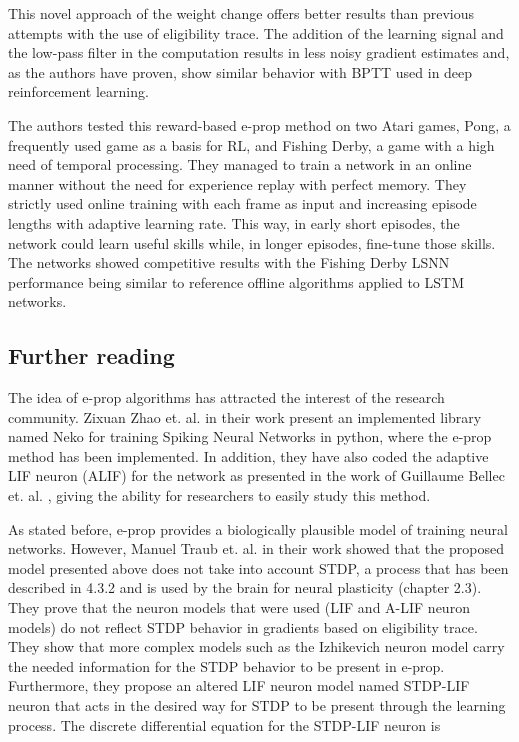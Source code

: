\documentclass[12pt]{report}
\begin{document}
This novel approach of the weight change offers better results than previous attempts with the use of eligibility trace. The addition of the learning signal and the low-pass filter in the computation results in less noisy gradient estimates and, as the authors have proven, show similar behavior with BPTT used in deep reinforcement learning. 

The authors tested this reward-based e-prop method on two Atari games, Pong, a frequently used game as a basis for RL, and Fishing Derby, a game with a high need of temporal processing. They managed to train a network in an online manner without the need for experience replay with perfect memory. They strictly used online training with each frame as input and increasing episode lengths with adaptive learning rate. This way, in early short episodes, the network could learn useful skills while, in longer episodes, fine-tune those skills. The networks showed competitive results with the Fishing Derby LSNN performance being similar to reference offline algorithms applied to LSTM networks.

\subsection{Further reading}

The idea of e-prop algorithms has attracted the interest of the research community. Zixuan Zhao et. al. in their work \cite{Brasoveanu2020} present an implemented library named Neko for training Spiking Neural Networks in python, where the e-prop method has been implemented. In addition, they have also coded the adaptive LIF neuron (ALIF) for the network as presented in the work of Guillaume  Bellec et. al. \cite{Bellec2020}, giving the ability for researchers to easily study this method. 

As stated before, e-prop provides a biologically plausible model of training neural networks. However, Manuel Traub et. al. in their work \cite{Traub2020} showed that the proposed model presented above does not take into account STDP, a process that has been described in 4.3.2 and is used by the brain for neural plasticity (chapter 2.3). They prove that the neuron models that were used (LIF and A-LIF neuron models) do not reflect STDP behavior in gradients based on eligibility trace. They show that more complex models such as the Izhikevich neuron model carry the needed information for the STDP behavior to be present in e-prop. Furthermore, they propose an altered LIF neuron model named STDP-LIF neuron that acts in the desired way for STDP to be present through the learning process. The discrete differential equation for the STDP-LIF neuron is
\end{document}
